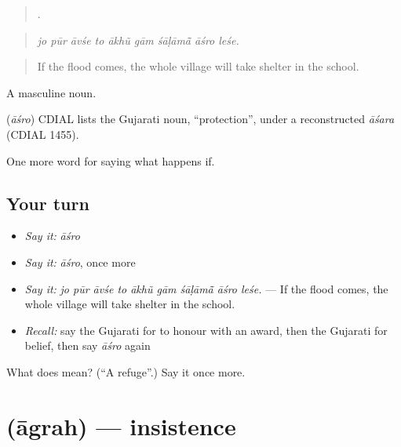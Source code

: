 \begin{quote}
        .
\end{quote}

\begin{quote}
\emph{jo pūr āvśe to ākhũ gām śāḷāmā̃ āśro leśe.}
\end{quote}

\begin{quote}
If the flood comes, the whole village will take shelter in the school.
\end{quote}

A masculine noun.

\begin{cousinweb}
\textbf{} (\emph{āśro}) CDIAL lists the Gujarati noun, \textquotedblleft{}protection\textquotedblright{}, under a reconstructed \emph{āśara} (CDIAL 1455).
\end{cousinweb}

\begin{grammarlens}[title={What you've built}]
One more word for saying what happens if.
\end{grammarlens}

\subsection*{Your turn}
\begin{itemize}
\raggedright
  \item \emph{Say it:} \emph{āśro}
  \item \emph{Say it:} \emph{āśro}, once more
  \item \emph{Say it:} \emph{jo pūr āvśe to ākhũ gām śāḷāmā̃ āśro leśe.} — If the flood comes, the whole village will take shelter in the school.
  \item \emph{Recall:} say the Gujarati for to honour with an award, then the Gujarati for belief, then say \emph{āśro} again
\end{itemize}

\begin{tcolorbox}[breakable,colback=teal!4,colframe=teal!35!black,title={Before you move on}]
What does  mean? (\textquotedblleft{}A refuge\textquotedblright{}.) Say it once more.
\end{tcolorbox}
\section[\texorpdfstring{\gu{આગ્રહ} (āgrah)}{આગ્રહ (āgrah)}]{ (āgrah) — insistence}

